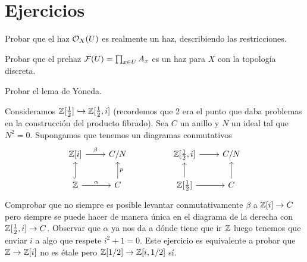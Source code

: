 \documentclass[GA.tex]{subfiles}
\begin{document}
\section{Ejercicios}
\begin{ejer}
Probar que el haz ${\mathcal O}_X(U)$ es realmente un haz, describiendo las restricciones. 
\end{ejer}
\begin{ejer}
Probar que el prehaz $\mathcal{F}(U)=\prod_{x\in U} A_x$ es un haz para $X$ con la topología discreta. 
\end{ejer}
\begin{ejer}
Probar el lema de Yoneda. 
\end{ejer}
\begin{ejer}
Consideramos $\mathbb{Z}[\frac{1}{2}]\hookrightarrow\mathbb{Z}[\frac{1}{2},i]$ (recordemos que 2 era el punto que daba problemas en la construcción del producto fibrado). Sea $C$ un anillo y $N$ un ideal tal que $N^2=0$. Supongamos que tenemos un diagramas conmutativos
\[
\begin{tikzcd}
\Z[i]\arrow[r, "\beta"] & C/N & & \Z[\frac{1}{2},i]\arrow[r] & C/N\\
\Z\arrow[u, hookrightarrow]\arrow[r, "\alpha"] & C\arrow[u, "p"'] & & \Z[\frac{1}{2}]\arrow[u]\arrow[r] & C\arrow[u]
\end{tikzcd}
\]
Comprobar que no siempre es posible levantar conmutativamente $\beta$ a $\mathbb{Z}[i]\to C$ pero siempre se puede hacer de manera única en el diagrama de la derecha con $\mathbb{Z}[\frac{1}{2},i]\to C$. Observar que $\alpha$ ya nos da a dónde tiene que ir $\mathbb{Z}$ luego tenemos que enviar $i$ a algo que respete $i^2+1=0$. Este ejercicio es equivalente a probar que $\mathbb{Z}\to\mathbb{Z}[i]$ no es étale pero $\mathbb{Z}[1/2]\to \mathbb{Z}[i,1/2]$ sí. 
\end{ejer}
\end{document}
